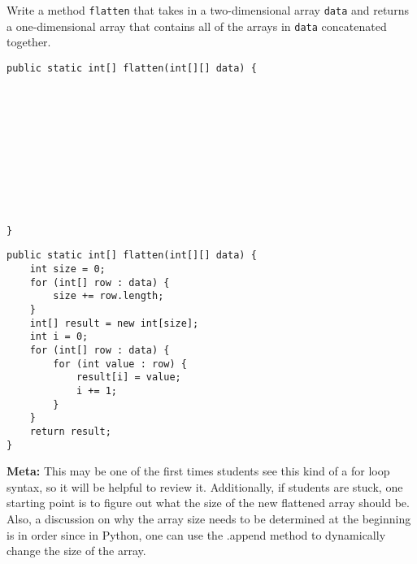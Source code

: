 \begin{blocksection}
\question Write a method \lstinline$flatten$ that takes in a two-dimensional array
\lstinline$data$ and returns a one-dimensional array that contains all of the
arrays in \lstinline$data$ concatenated together.

\ifprintanswers\else
\begin{lstlisting}
public static int[] flatten(int[][] data) {











}
\end{lstlisting}
\fi

\begin{solution}
\begin{lstlisting}
public static int[] flatten(int[][] data) {
    int size = 0;
    for (int[] row : data) {
        size += row.length;
    }
    int[] result = new int[size];
    int i = 0;
    for (int[] row : data) {
        for (int value : row) {
            result[i] = value;
            i += 1;
        }
    }
    return result;
}
\end{lstlisting}
\textbf{Meta:} This may be one of the first times students see this kind of a for loop syntax, so it will be helpful to review it. Additionally, if students are stuck, one starting point is to figure out what the size of the new flattened array should be. Also, a discussion on why the array size needs to be determined at the beginning is in order since in Python, one can use the .append method to dynamically change the size of the array.
\end{solution}
\end{blocksection}
